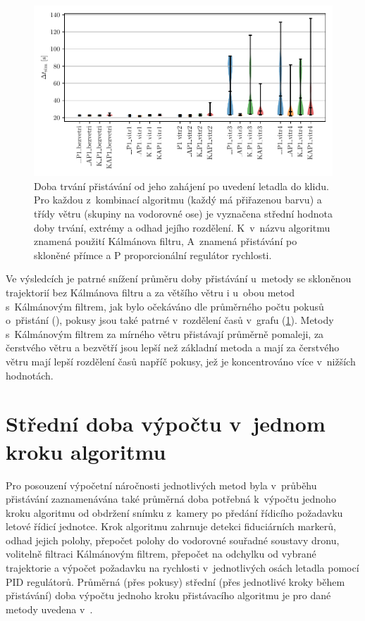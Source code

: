     \begin{figure}[H]
      \centering
      \includegraphics[width=\textwidth]{img/results/trvani.pdf}
      \caption[Doba trvání přistávání]{Doba trvání přistávání od jeho zahájení po uvedení letadla do klidu. Pro každou z~kombinací algoritmu (každý má přiřazenou barvu) a třídy větru (skupiny na vodorovné ose) je vyznačena střední hodnota doby trvání, extrémy a odhad jejího rozdělení. K~v~názvu algoritmu znamená použití Kálmánova filtru, A~znamená přistávání po skloněné přímce a P proporcionální regulátor rychlosti.}
      \label{fig:dobaPristavani}
    \end{figure}

    Ve výsledcích je patrné snížení průměru doby přistávání u~metody se skloněnou trajektorií bez Kálmánova filtru a za většího větru i u~obou metod s~Kálmánovým filtrem, jak bylo očekáváno dle průměrného počtu pokusů o~přistání (), pokusy jsou také patrné v~rozdělení časů v~grafu (\cref{fig:dobaPristavani}). Metody s~Kálmánovým filtrem za mírného větru přistávají průměrně pomaleji, za čerstvého větru a bezvětří jsou lepší než základní metoda a mají za čerstvého větru mají lepší rozdělení časů napříč pokusy, jež je koncentrováno více v~nižších hodnotách.
    

  \section{Střední doba výpočtu v~jednom kroku algoritmu} \label{sec:stredniDobaVypoctu}
    Pro posouzení výpočetní náročnosti jednotlivých metod byla v~průběhu přistávání zaznamenávána také průměrná doba potřebná k~výpočtu jednoho kroku algoritmu od obdržení snímku z~kamery po předání řídicího požadavku letové řídicí jednotce. Krok algoritmu zahrnuje detekci fiduciárních markerů, odhad jejich polohy, přepočet polohy do vodorovné souřadné soustavy dronu, volitelně filtraci Kálmánovým filtrem, přepočet na odchylku od vybrané trajektorie a výpočet požadavku na rychlosti v~jednotlivých osách letadla pomocí PID regulátorů. Průměrná (přes pokusy) střední (přes jednotlivé kroky během přistávání) %
    doba výpočtu jednoho kroku přistávacího algoritmu je pro dané metody uvedena v~.


